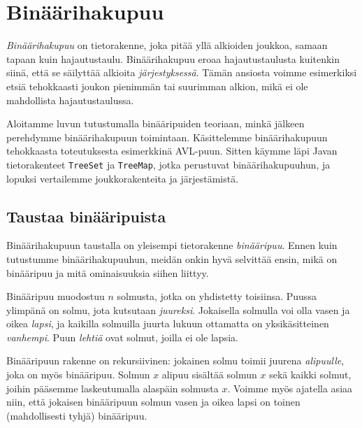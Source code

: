 \chapter{Binäärihakupuu}


\emph{Binäärihakupuu} on tietorakenne, joka pitää yllä
alkioiden joukkoa, samaan tapaan kuin hajautustaulu.
Binäärihakupuu eroaa hajautustaulusta kuitenkin siinä,
että se säilyttää alkioita \emph{järjestyksessä}.
Tämän ansiosta voimme esimerkiksi etsiä tehokkaasti
joukon pienimmän tai suurimman alkion,
mikä ei ole mahdollista hajautustaulussa.

Aloitamme luvun tutustumalla binääripuiden teoriaan,
minkä jälkeen perehdymme binäärihakupuun toimintaan.
Käsittelemme binäärihakupuun tehokkaasta toteutuksesta
esimerkkinä AVL-puun.
Sitten käymme läpi Javan tietorakenteet
\texttt{TreeSet} ja \texttt{TreeMap}, jotka
perustuvat binäärihakupuuhun,
ja lopuksi vertailemme joukkorakenteita ja järjestämistä.

\section{Taustaa binääripuista}


Binäärihakupuun taustalla on yleisempi tietorakenne \emph{binääripuu}.
Ennen kuin tutustumme binäärihakupuuhun,
meidän onkin hyvä selvittää ensin, mikä on binääripuu ja mitä
ominaisuuksia siihen liittyy.


Binääripuu muodostuu $n$ solmusta, jotka on yhdistetty toisiinsa.
Puussa ylimpänä on solmu, jota kutsutaan \emph{juureksi}.
Jokaisella solmulla voi olla vasen ja oikea \emph{lapsi},
ja kaikilla solmuilla juurta lukuun ottamatta on yksikäsitteinen \emph{vanhempi}.
Puun \emph{lehtiä} ovat solmut, joilla ei ole lapsia.


Binääripuun rakenne on rekursiivinen:
jokainen solmu toimii juurena \emph{alipuulle},
joka on myös binääripuu.
Solmun $x$ alipuu sisältää solmun $x$ sekä kaikki
solmut, joihin pääsemme laskeutumalla alaspäin solmusta $x$.
Voimme myös ajatella asiaa niin, että jokaisen binääripuun
solmun vasen ja oikea lapsi on toinen (mahdollisesti tyhjä) binääripuu.

